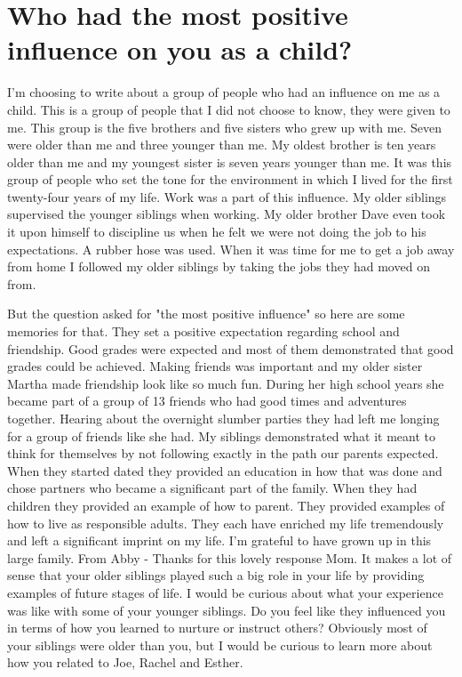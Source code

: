 \section{Who had the most positive influence on you as a child?}
I'm choosing to write about a group of people who had an influence on me as a child.
This is a group of people that I did not choose to know, they were given to me.
This group is the five brothers and five sisters who grew up with me.
Seven were older than me and three younger than me.
My oldest brother is ten years older than me and my youngest sister is seven years younger than me.
It was this group of people who set the tone for the environment in which I lived for the first twenty-four years of my life.
Work was a part of this influence.
My older siblings supervised the younger siblings when working.
My older brother Dave even took it upon himself to discipline us when he felt we were not doing the job to his expectations.
A rubber hose was used.
When it was time for me to get a job away from home I followed my older siblings by taking the jobs they had moved on from.

But the question asked for "the most positive influence" so here are some memories for that.
They set a positive expectation regarding school and friendship.
Good grades were expected and most of them demonstrated that good grades could be achieved.
Making friends was important and my older sister Martha made friendship look like so much fun.
During her high school years she became part of a group of 13 friends who had good times and adventures together.
Hearing about the overnight slumber parties they had left me longing for a group of friends like she had.
My siblings demonstrated what it meant to think for themselves by not following exactly in the path our parents expected.
When they started dated they provided an education in how that was done and chose partners who became a significant part of the family.
When they had children they provided an example of how to parent.
They provided examples of how to live as responsible adults.
They each have enriched my life tremendously and left a significant imprint on my life.
I'm grateful to have grown up in this large family.
From Abby - Thanks for this lovely response Mom.
It makes a lot of sense that your older siblings played such a big role in your life by providing examples of future stages of life.
I would be curious about what your experience was like with some of your younger siblings.
Do you feel like they influenced you in terms of how you learned to nurture or instruct others? Obviously most of your siblings were older than you, but I would be curious to learn more about how you related to Joe, Rachel and Esther.

